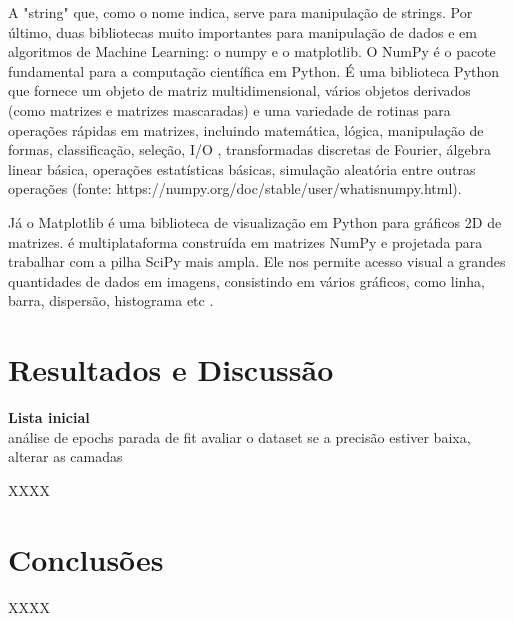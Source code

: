 \documentclass[twoside,conference,a4paper]{IEEEtran}
\begin{document}
A "string" que, como o nome indica, serve para manipulação de strings.
Por último, duas bibliotecas muito importantes para manipulação de dados e em algoritmos de Machine Learning: o numpy e o matplotlib. O NumPy é o pacote fundamental para a computação científica em Python. É uma biblioteca Python que fornece um objeto de matriz multidimensional, vários objetos derivados (como matrizes e matrizes mascaradas) e uma variedade de rotinas para operações rápidas em matrizes, incluindo matemática, lógica, manipulação de formas, classificação, seleção, I/O , transformadas discretas de Fourier, álgebra linear básica, operações estatísticas básicas, simulação aleatória entre outras operações (fonte: https://numpy.org/doc/stable/user/whatisnumpy.html).

Já o Matplotlib é uma biblioteca de visualização em Python para gráficos 2D de matrizes. é multiplataforma construída em matrizes NumPy e projetada para trabalhar com a pilha SciPy mais ampla. Ele nos permite acesso visual a grandes quantidades de dados em imagens, consistindo em vários gráficos, como linha, barra, dispersão, histograma etc .

\section{Resultados e Discussão}


\textbf{Lista inicial}\\
análise de epochs
parada de fit
avaliar o dataset
se a precisão estiver baixa, alterar as camadas

XXXX

\section{Conclusões}

XXXX









\vspace{20ex}

\vspace{3ex}
\end{document}
